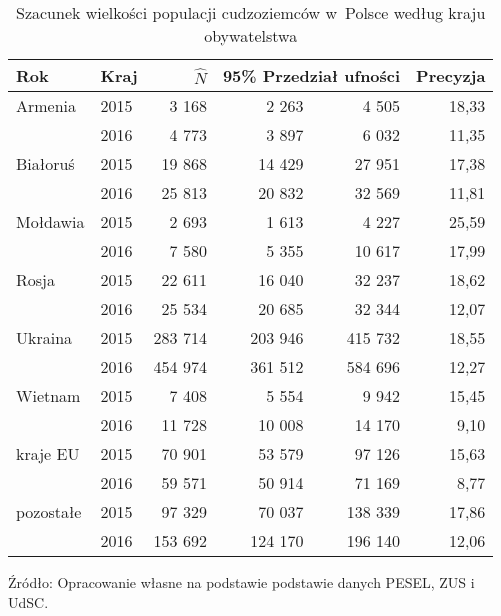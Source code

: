 \documentclass[12pt,a4paper]{article}
\providecommand{\DIFaddbeginFL}{} %
\providecommand{\DIFaddendFL}{} %
\begin{document}
\begin{table}[ht!]
\caption{Szacunek wielkości populacji cudzoziemców w~Polsce według kraju obywatelstwa}
\label{tab-szacunek-szczegoly}
    \centering
    \begin{tabular}{llrrrr}
    \hline
    Rok & Kraj & $\hat{N}$ &  \multicolumn{2}{c}{95\% Przedział ufności} & Precyzja \\
    \hline
Armenia & 2015  & 3 168 & 2 263 & 4 505 & 18,33 \\ 
 & 2016  & 4 773 & 3 897 & 6 032 & 11,35 \\ 
Białoruś & 2015  & 19 868 & 14 429 & 27 951 & 17,38 \\ 
 & 2016  & 25 813 & 20 832 & 32 569 & 11,81 \\ 
Mołdawia & 2015  & 2 693 & 1 613 & 4 227 & 25,59 \\ 
 & 2016  & 7 580 & 5 355 & 10 617 & 17,99 \\ 
Rosja & 2015  & 22 611 & 16 040 & 32 237 & 18,62 \\ 
 & 2016  & 25 534 & 20 685 & 32 344 & 12,07 \\ 
Ukraina & 2015  & 283 714 & 203 946 & 415 732 & 18,55 \\ 
 & 2016  & 454 974 & 361 512 & 584 696 & 12,27 \\ 
Wietnam & 2015  & 7 408 & 5 554 & 9 942 & 15,45 \\ 
 & 2016  & 11 728 & 10 008 & 14 170 & 9,10 \\ 
kraje EU & 2015 & 70 901 & 53 579 & 97 126 & 15,63 \\ 
 & 2016 & 59 571 & 50 914 & 71 169 & 8,77 \\ 
pozostałe & 2015  & 97 329 & 70 037 & 138 339 & 17,86 \\ 
 & 2016  & 153 692 & 124 170 & 196 140 & 12,06 \\ 
    \hline     
    \end{tabular}
    \DIFaddbeginFL \begin{flushleft}
\small{
Źródło: Opracowanie własne na podstawie podstawie danych PESEL, ZUS i UdSC.
}
\end{flushleft}
\DIFaddendFL \end{table}
\end{document}
